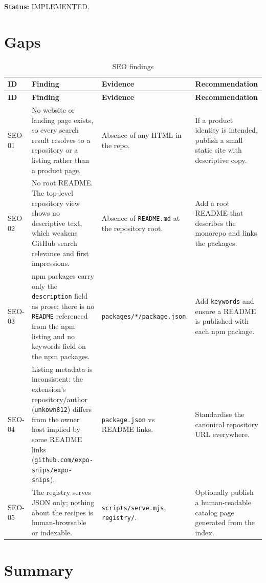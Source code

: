 \textbf{Status:} IMPLEMENTED.

\section{Gaps}

\begin{longtable}{@{}L{1.5cm}L{4.6cm}L{3.4cm}L{4.7cm}@{}}
\caption{SEO findings}\\
\toprule
\textbf{ID} & \textbf{Finding} & \textbf{Evidence} & \textbf{Recommendation} \\
\midrule
\endfirsthead
\toprule
\textbf{ID} & \textbf{Finding} & \textbf{Evidence} & \textbf{Recommendation} \\
\midrule
\endhead
SEO-01 & No website or landing page exists, so every search result resolves to a
repository or a listing rather than a product page. & Absence of any HTML in the
repo. & If a product identity is intended, publish a small static site with
descriptive copy. \\
SEO-02 & No root README. The top-level repository view shows no descriptive text,
which weakens GitHub search relevance and first impressions. & Absence of
\texttt{README.md} at the repository root. & Add a root README that describes the
monorepo and links the packages. \\
SEO-03 & npm packages carry only the \texttt{description} field as prose; there is
no \texttt{README} referenced from the npm listing and no keywords field on the
npm packages. & \texttt{packages/*/package.json}. & Add \texttt{keywords} and
ensure a README is published with each npm package. \\
SEO-04 & Listing metadata is inconsistent: the extension's repository/author
(\texttt{unkown812}) differs from the owner host implied by some README links
(\texttt{github.com/expo-snips/expo-snips}). & \texttt{package.json} vs README
links. & Standardise the canonical repository URL everywhere. \\
SEO-05 & The registry serves JSON only; nothing about the recipes is
human-browsable or indexable. & \texttt{scripts/serve.mjs}, \texttt{registry/}. &
Optionally publish a human-readable catalog page generated from the index. \\
\bottomrule
\end{longtable}

\section{Summary}

